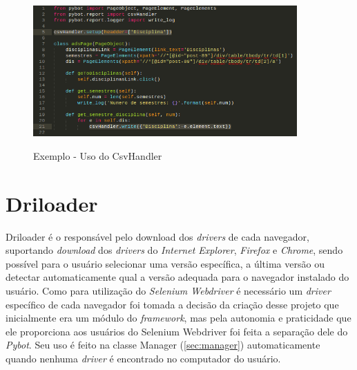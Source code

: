         \begin{figure}[H]
            \vspace*{0,3cm}
            \centering
            \caption{Exemplo - Uso do CsvHandler}
            \includegraphics[width=0.9\textwidth]{./04-figuras/csv}
            \label{fig:csv}
        \end{figure}


    \section{Driloader}
    \label{driloader}
        Driloader é o responsável pelo download dos \textit{drivers} de cada navegador, suportando \textit{download} dos \textit{drivers} do \textit{Internet Explorer},
        \textit{Firefox} e \textit{Chrome}, sendo possível para o usuário selecionar uma versão específica, a última versão ou detectar automaticamente qual a versão adequada para o navegador
        instalado do usuário. Como para utilização do \textit{Selenium Webdriver} é necessário um \textit{driver} específico de cada navegador foi tomada a decisão da criação
        desse projeto que inicialmente era um módulo do \textit{framework}, mas pela autonomia e praticidade que ele proporciona aos usuários do Selenium Webdriver foi feita a
        separação dele do \textit{Pybot}. Seu uso é feito na classe Manager (\autoref{sec:manager}) automaticamente quando nenhuma \textit{driver} é encontrado no computador do usuário.



